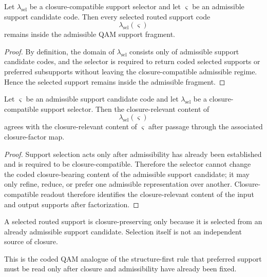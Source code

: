 \begin{proposition}
Let $\lambda_{\mathrm{sel}}$ be a closure-compatible support selector and let $\varsigma$ be an admissible support candidate code. Then every selected routed support code
\[
\lambda_{\mathrm{sel}}(\varsigma)
\]
remains inside the admissible QAM support fragment.
\end{proposition}

\begin{proof}
By definition, the domain of $\lambda_{\mathrm{sel}}$ consists only of admissible support candidate codes, and the selector is required to return coded selected supports or preferred subsupports without leaving the closure-compatible admissible regime. Hence the selected support remains inside the admissible fragment.
\end{proof}

\begin{proposition}
Let $\varsigma$ be an admissible support candidate code and let $\lambda_{\mathrm{sel}}$ be a closure-compatible support selector. Then the closure-relevant content of
\[
\lambda_{\mathrm{sel}}(\varsigma)
\]
agrees with the closure-relevant content of $\varsigma$ after passage through the associated closure-factor map.
\end{proposition}

\begin{proof}
Support selection acts only after admissibility has already been established and is required to be closure-compatible. Therefore the selector cannot change the coded closure-bearing content of the admissible support candidate; it may only refine, reduce, or prefer one admissible representation over another. Closure-compatible readout therefore identifies the closure-relevant content of the input and output supports after factorization.
\end{proof}

\begin{corollary}
A selected routed support is closure-preserving only because it is selected from an already admissible support candidate. Selection itself is not an independent source of closure.
\end{corollary}

\begin{remark}
This is the coded QAM analogue of the structure-first rule that preferred support must be read only after closure and admissibility have already been fixed.
\end{remark}

